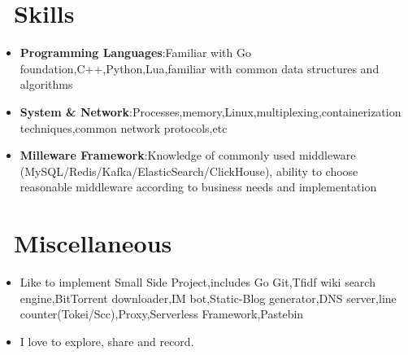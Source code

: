 \documentclass{resume}
\newcommand{\en}[1]{#1}
\newcommand{\zh}[1]{}
\begin{document}
\section{\faCogs\ \en{Skills}\zh{技能}}
\begin{itemize}[parsep=0.5ex]
      \item \en{\textbf{Programming Languages}:Familiar with Go foundation,C++,Python,Lua,familiar with common data structures and algorithms}
            \zh{\textbf{编程语言}:熟悉 Go,了解 C++、Python、Lua,熟悉常用数据结构与算法}
      \item \en{\textbf{System \& Network}:Processes,memory,Linux,multiplexing,containerization techniques,common network protocols,etc}
            \zh{\textbf{系统 \& 网络}:进程、内存、Linux、多路复用、容器化技术、常见网络协议等}
      \item \en{\textbf{Milleware Framework}:Knowledge of commonly used middleware (MySQL/Redis/Kafka/ElasticSearch/ClickHouse), ability to choose reasonable middleware according to business needs and implementation}
            \zh{\textbf{中间件}:了解常用中间件（MySQL/Redis/Kafka/ElasticSearch/ClickHouse）,能根据业务需求选择合理的中间件并实现}
\end{itemize}

\section{\faInfo\ \en{Miscellaneous}\zh{杂项}}
\begin{itemize}[parsep=0.5ex]
      \item \en{Like to implement Small Side Project,includes Go Git,Tfidf wiki search engine,BitTorrent downloader,IM bot,Static-Blog generator,DNS server,line counter(Tokei/Scc),Proxy,Serverless Framework,Pastebin}
            \zh{喜欢实现 Small Side Project,包括 Go Git、Tfidf wiki 搜索引擎、BitTorrent downloader、IM bot、Static-Blog generator、line counter(Tokei/Scc)、Proxy、Serverless Framework、Pastebin 等等}
      \item \en{I love to explore, share and record.}
            \zh{喜欢折腾和探索,热爱分享和记录}
\end{itemize}
\end{document}
